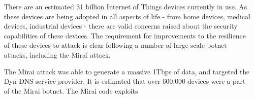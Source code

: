 There are an estimated 31 billion Internet of Things devices currently in use.
As these devices are being adopted in all aspects of life - from home devices,
medical devices, industrial devices - there are valid concerns raised about the
security capabilities of these devices. The requirement for improvements to the
resilience of these devices to attack is clear following a number of large scale
botnet attacks, including the Mirai attack.

The Mirai attack was able to generate a massive 1Tbps of data, and targeted the
Dyn DNS service provider. It is estimated that over 600,000 devices were
a part of the Mirai botnet. The Mirai code exploits

